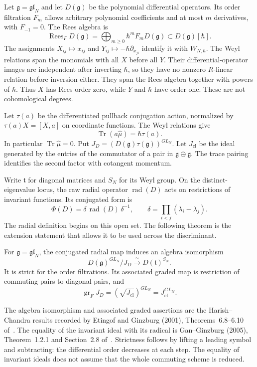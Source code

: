 Let $\mathfrak g=\mathfrak{gl}_N$ and let $D(\mathfrak g)$
be the polynomial differential operators.
Its order filtration $F_m$ allows arbitrary polynomial
coefficients and at most $m$ derivatives, with $F_{-1}=0$.
The Rees algebra is
\[
 \operatorname{Rees}_F D(\mathfrak g)
  =\bigoplus_{m\geq0}\hbar^mF_mD(\mathfrak g)
       \subset D(\mathfrak g)[\hbar].
\]
The assignments
$X_{ij}\mapsto x_{ij}$ and
$Y_{ij}\mapsto-\hbar\partial_{x_{ji}}$ identify it with
$W_{N,\hbar}$. The Weyl relations span the monomials with
all $X$ before all $Y$. Their differential-operator images
are independent after inverting $\hbar$, so they have no
nonzero $R$-linear relation before inversion either.
They span the Rees algebra together with powers of $\hbar$.
Thus $X$ has Rees order zero, while $Y$ and $\hbar$ have
order one. These are not cohomological degrees.

Let $\tau(a)$ be the differentiated pullback conjugation
action, normalized by $\tau(a)X=[X,a]$ on coordinate
functions. The Weyl relations give
\[
 \operatorname{Tr}(a\widehat\mu)=\hbar\tau(a).
\]
In particular $\operatorname{Tr}\widehat\mu=0$.
Put $J_D=(D(\mathfrak g)\tau(\mathfrak g))^{GL_N}$.
Let $J_{\mathrm{cl}}$ be the ideal generated by the entries
of the commutator of a pair in $\mathfrak g\oplus\mathfrak g$.
The trace pairing identifies the second factor with
cotangent momentum.

Write $\mathfrak t$ for diagonal matrices and $S_N$ for
its Weyl group. On the distinct-eigenvalue locus, the raw
radial operator $\operatorname{rad}(D)$ acts on restrictions
of invariant functions. Its conjugated form is
\[
 \Phi(D)=\delta\,\operatorname{rad}(D)\,\delta^{-1},
 \qquad
 \delta=\prod_{i<j}(\lambda_i-\lambda_j).
\]
The radial definition begins on this open set.
The following theorem is the extension statement that
allows it to be used across the discriminant.

\begin{theorem}
\label{thm:vol2-filtered-harish-chandra}
For $\mathfrak g=\mathfrak{gl}_N$, the conjugated radial map
induces an algebra isomorphism
\[
 D(\mathfrak g)^{GL_N}/J_D
   \xrightarrow{\ \sim\ }D(\mathfrak t)^{S_N}.
\]
It is strict for the order filtrations. Its associated
graded map is restriction of commuting pairs to diagonal
pairs, and
\[
 \operatorname{gr}_FJ_D
       =(\sqrt{J_{\mathrm{cl}}})^{GL_N}
       =J_{\mathrm{cl}}^{GL_N}.
\]
\end{theorem}

The algebra isomorphism and associated graded assertions are
the Harish--Chandra results recorded by Etingof and Ginzburg
(2001), Theorems~6.8--6.10 of~\cite{EG2001HC}.
The equality of the invariant ideal with its radical is
Gan--Ginzburg (2005), Theorem~1.2.1 and
Section~2.8 of~\cite{GG2005Almost}.
Strictness follows by lifting a leading symbol and subtracting:
the differential order decreases at each step.
The equality of invariant ideals does not assume that the
whole commuting scheme is reduced.

